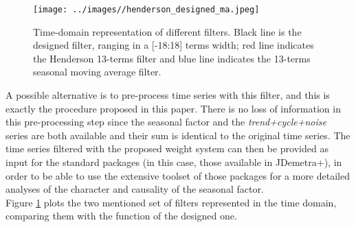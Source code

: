 \documentclass{article}
\begin{document}
\begin{figure}[h]
\texttt{[image: ../images//henderson\_designed\_ma.jpeg]}
\caption{Time-domain representation of different filters. Black line is the designed filter, ranging in a [-18:18] terms width; red line indicates the Henderson 13-terms filter and blue line indicates the 13-terms seasonal moving average filter.}
\label{fig:henderson_designed_ma}
\end{figure}
A possible alternative is to pre-process time series with this filter, and this is exactly the procedure proposed in this paper. There is no loss of information in this pre-processing step since the seasonal factor and the \textit{trend+cycle+noise} series are both available and their sum is identical to the original time series. The time series filtered with the proposed weight system can then be provided as input for the standard packages (in this case, those available in JDemetra+), in order to be able to use the extensive toolset of those packages for a more detailed analyses of the character and causality of the seasonal factor.\\
Figure \ref{fig:henderson_designed_ma} plots the two mentioned set of filters represented in the time domain, comparing them with the function of the designed one.
\end{document}
